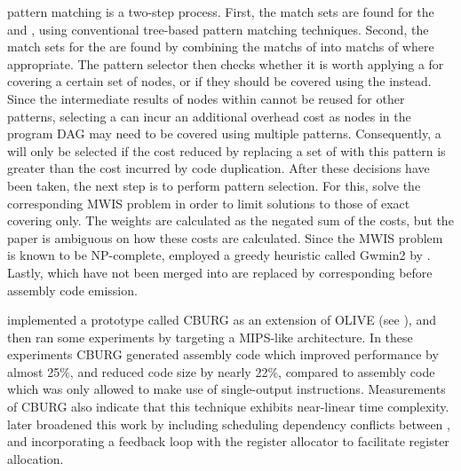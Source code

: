 \Gls{pattern matching} is a two-step process.
%
First, the \glspl{match set} are
found for the  and \tsplitPatterns, using conventional
\gls{tree}-based \gls{pattern matching} techniques.
%
Second, the \glspl{match set}
for the \tcomplexPatterns are found by combining the \glspl{match} of
\tsplitPatterns into \glspl{match} of \tcomplexPatterns where appropriate.
%
The
\gls{pattern selector} then checks whether it is worth applying a
\tcomplexPattern for covering a certain set of \glspl{node}, or if they should
be covered using the \tsimplePatterns instead.
%
Since the intermediate results of
\glspl{node} within \tcomplexPatterns cannot be reused for other
\glspl{pattern}, selecting a \tcomplexPattern can incur an additional overhead
cost as \glspl{node} in the \gls{program DAG} may need to be covered using
multiple \glspl{pattern}.
%
Consequently, a \tcomplexPattern will only be selected
if the cost reduced by replacing a set of \tsimplePatterns with this
\gls{pattern} is greater than the cost incurred by code duplication.
%
After these
decisions have been taken, the next step is to perform \gls{pattern
  selection}.
%
For this, \citeauthor{Scharwaechter2007} solve the corresponding
\gls{MWIS problem} in order to limit solutions to those of exact covering
only.
%
The weights are calculated as the negated sum of the \tsplitPattern costs,
but the paper is ambiguous on how these costs are calculated.
%
Since the
\gls{MWIS problem} is known to be NP-complete,
\citeauthor{Scharwaechter2007} employed a greedy heuristic called \gls{Gwmin2}
by \textcite{Sakai2003}.
%
Lastly, \tsplitPatterns which have not been merged into
\tcomplexPatterns are replaced by corresponding \tsimplePatterns before
\gls{assembly code} emission.

\citeauthor{Scharwaechter2007} implemented a prototype called \gls{CBURG} as an
extension of \gls{OLIVE} (see ), and then ran some experiments
by targeting a \gls{MIPS}-like architecture.
%
In these experiments \gls{CBURG}
generated \gls{assembly code} which improved performance by almost 25\%, and
reduced code size by nearly 22\%, compared to \gls{assembly code} which was only
allowed to make use of \glspl{single-output instruction}.
%
Measurements of
\gls{CBURG} also indicate that this technique exhibits near-linear time
complexity.
%
\textcite{Ahn2009} later broadened this work by including scheduling
dependency conflicts between \tcomplexPatterns, and incorporating a feedback
loop with the \gls{register allocator} to facilitate \gls{register allocation}.

